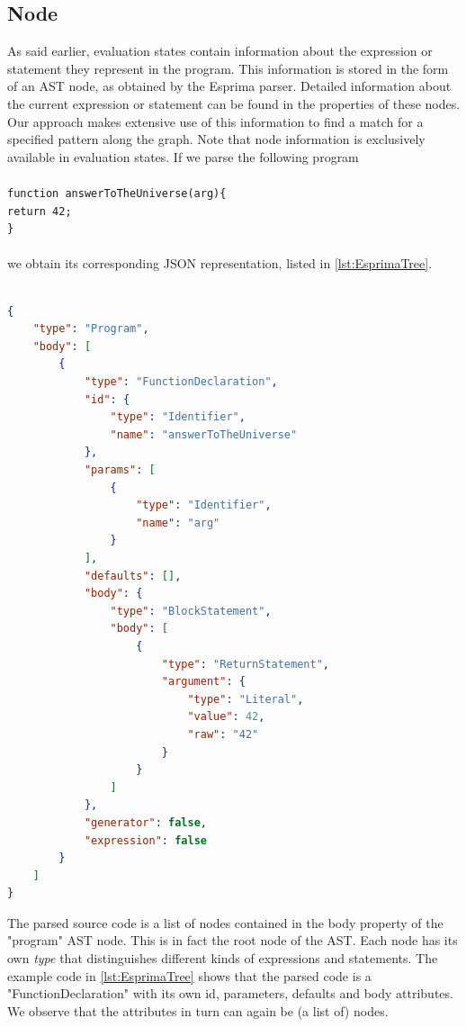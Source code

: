 \subsection*{Node}

As said earlier, evaluation states contain information about the expression or statement they represent in the program. This information is stored in the form of an AST node, as obtained by the Esprima parser. Detailed information about the current expression or statement can be found in the properties of these nodes. Our approach makes extensive use of this information to find a match for a specified pattern along the graph. Note that node information is exclusively available in evaluation states. If we parse the following program \\\\
\texttt{function answerToTheUniverse(arg)\{}\\
\phantom{ }\phantom{ }\phantom{ }\phantom{ }\texttt{return 42;}\\
\texttt{\}}\\
\\
we obtain its corresponding JSON representation, listed in \ref{lst:EsprimaTree}.
\\
\begin{lstlisting}[label={lst:EsprimaTree},language=JSON,caption=Parsed JavaScript program AST, mathescape=true]  % float=t?

{
    "type": "Program",
    "body": [
        {
            "type": "FunctionDeclaration",
            "id": {
                "type": "Identifier",
                "name": "answerToTheUniverse"
            },
            "params": [
                {
                    "type": "Identifier",
                    "name": "arg"
                }
            ],
            "defaults": [],
            "body": {
                "type": "BlockStatement",
                "body": [
                    {
                        "type": "ReturnStatement",
                        "argument": {
                            "type": "Literal",
                            "value": 42,
                            "raw": "42"
                        }
                    }
                ]
            },
            "generator": false,
            "expression": false
        }
    ]
}
\end{lstlisting}

The parsed source code is a list of nodes contained in the body property of the "program" AST node. This is in fact the root node of the AST. Each node has its own \textit{type} that distinguishes different kinds of expressions and statements. The example code in \ref{lst:EsprimaTree} shows that the parsed code is a "FunctionDeclaration" with its own id, parameters, defaults and body attributes. We observe that the attributes in turn can again be (a list of) nodes.

